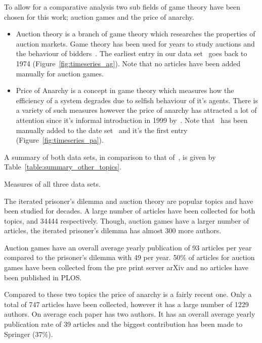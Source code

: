 \documentclass{article}
\theoremstyle{definition}
\newcommand{\totalarticles}{}
\begin{document}
To allow for a comparative analysis two sub fields of game theory have been chosen
for this work; auction games and the price of anarchy.

\begin{itemize}
    \item Auction theory is a branch of game theory which researches the
    properties of auction markets. Game theory has been used for years to study
    auctions and the behaviour of bidders~\cite{Shubik1971}. The earliest entry
    in our data set~\cite{auction_data_2018} goes back to 1974
    (Figure~\ref{fig:timeseries_ag}). Note that no articles have been added
    manually for auction games.
    \item Price of Anarchy is a concept in game theory which measures how the
    efficiency of a system degrades due to selfish behaviour of it's agents.
    There is a variety of such measures however the price of anarchy has
    attracted a lot of attention since it's informal introduction in 1999
    by~\cite{Koutsoupias1999}. Note that~\cite{Koutsoupias1999} has been
    manually added to the date set~\cite{anarchy_data_2018} and it's the first entry
    (Figure~\ref{fig:timeseries_pa}).
\end{itemize}

A summary of both data sets, in comparison to that of~\cite{pd_data_2018}, is
given by Table~\ref{table:summary_other_topics}.

\begin{table}[!hbtp]
    \centering
    \resizebox{\textwidth}{!}{
    }
    \caption{Measures of all three data sets.}\label{table:summary_other_topics}
\end{table}

The iterated prisoner's dilemma and auction theory are popular topics and have
been studied for decades. A large number of articles have
been collected for both topics, \totalarticles and 34444 respectively. Though, auction
games have a larger number of articles, the iterated prisoner's dilemma
has almost 300 more authors.

Auction games have an overall average yearly publication
of 93 articles per year compared to the prisoner's dilemma with 49 per year. 50\% of articles
for auction games have been collected from the pre print server arXiv and no articles have
been published in PLOS.

Compared to these two topics the price of anarchy is a fairly recent one. Only a
total of 747 articles have been collected, however it has a large number
of 1229 authors. On average each paper has two authors. It has an overall average
yearly publication rate of 39 articles and the biggest contribution has been made
to Springer (37\%).
\end{document}
